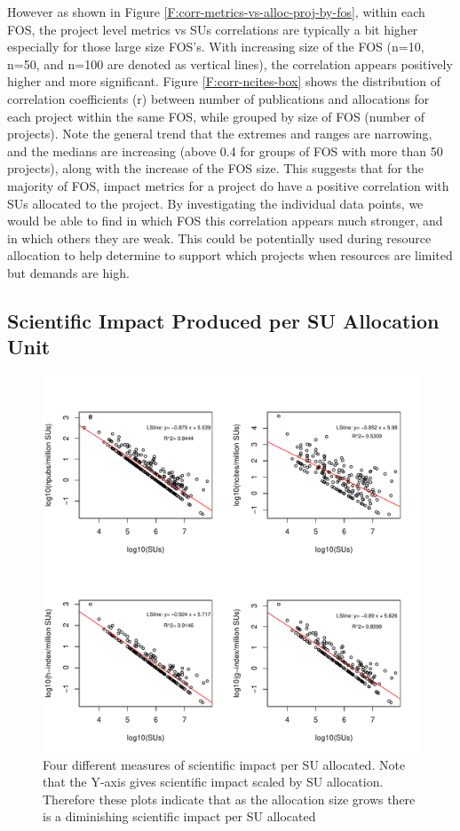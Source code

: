 \documentclass{sig-alternate}
\begin{document}
However as shown in Figure \ref{F:corr-metrics-vs-alloc-proj-by-fos}, within each FOS, the project level metrics vs SUs correlations are typically a bit higher especially for those large size FOS's. With increasing size of the FOS (n=10, n=50, and n=100 are denoted as vertical lines), the correlation appears positively higher and more significant. Figure \ref{F:corr-ncites-box} shows the distribution of correlation coefficients (r) between number of publications and allocations for each project within the same FOS, while grouped by size of FOS (number of projects). Note the general trend that the extremes and ranges are narrowing, and the medians are increasing (above 0.4 for groups of FOS with more than 50 projects), along with the increase of the FOS size. This suggests that for the majority of FOS, impact metrics for a project do have a positive correlation with SUs allocated to the project. By investigating the individual data points, we would be able to find in which FOS this correlation appears much stronger, and in which others they are weak. This could be potentially used during resource allocation to help determine to support which projects when resources are limited but demands are high.

\subsection{Scientific Impact Produced per SU Allocation Unit} 

\begin{figure}[!htb] 
  \centering 
    \includegraphics[width=1.0\columnwidth]{images/09_roi_projs.pdf} 
  \caption{Four different measures of scientific impact per SU allocated.  Note that the Y-axis gives scientific impact scaled by SU allocation. Therefore these plots indicate that as the allocation size grows there is a diminishing scientific impact per SU allocated}\label{F:projs-roi} 
\end{figure} 
\end{document}
